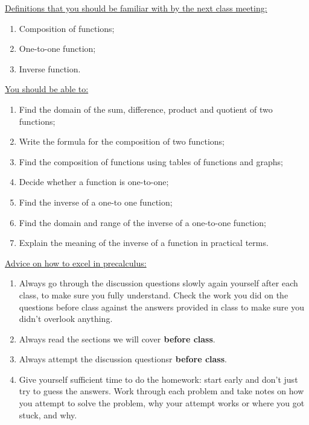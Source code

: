 \documentclass[12pt,dvipsnames]{article}
\begin{document}
 \begin{mdframed}[style=exampledefault,frametitle={Looking Ahead to Next Week...}]
 	{\underline{Definitions that you should be familiar with by the next class meeting:} }
 	\begin{enumerate}[label= {  \arabic*:},labelindent=2em, style = standard,leftmargin=4pc, labelsep=*, noitemsep]
 		\item Composition of functions;
\item One-to-one function;
                     \item Inverse function.
 		
 	\end{enumerate}
 	{\underline{You should be able to:} }
 	\begin{enumerate}[label= {  \arabic*:},labelindent=2em, style = standard,leftmargin=4pc, labelsep=*, noitemsep]
 		\item Find the domain of the sum, difference, product and quotient of two functions;
                     \item Write the formula for the composition of two functions;
\item Find the composition of functions using tables of functions and graphs;
                     \item Decide whether a function is one-to-one;
\item Find the inverse of a one-to one function; 
\item Find the domain and range of the inverse of a one-to-one function;
\item Explain the meaning of the inverse of a function in practical terms.
 	\end{enumerate}
{\underline{Advice on how to excel in precalculus:} }
\begin{enumerate}[label= {  \arabic*:},labelindent=2em, style = standard,leftmargin=4pc, labelsep=*, noitemsep]
 		\item  Always go through the discussion questions slowly again yourself after each class, to make sure you fully understand.
Check the  work you did on the questions before class against the answers provided in class to make sure you didn’t overlook anything.
\item Always read the sections we will cover{\bf{ before class}}.
\item Always attempt the discussion questionsr{\bf{ before class}}.
\item Give yourself sufficient time to do the homework: start early and don't just try to guess the answers. Work through each problem and take notes on how you attempt to solve the problem, why your attempt works or where you got stuck, and why.
\end{enumerate}
 	\end{mdframed}
\end{document}

